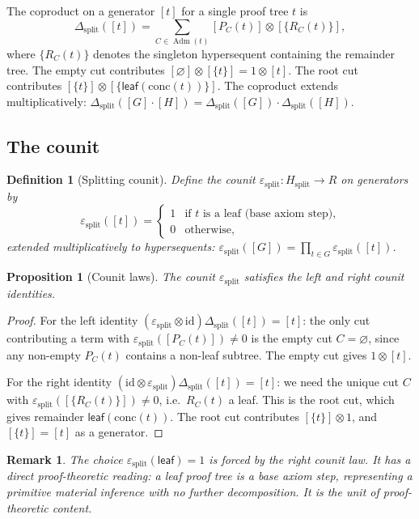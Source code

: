 \documentclass[11pt]{article}
\newtheorem{proposition}[theorem]{Proposition}
\newtheorem{definition}[theorem]{Definition}
\newtheorem{remark}[theorem]{Remark}
\begin{document}
The coproduct on a generator $[t]$ for a single proof tree $t$ is
\[
\Delta_{\mathrm{split}}([t])
=
\sum_{C\in\operatorname{Adm}(t)}
[P_C(t)]\otimes [\{R_C(t)\}],
\]
where $\{R_C(t)\}$ denotes the singleton hypersequent containing the remainder tree.  The empty cut contributes $[\varnothing]\otimes[\{t\}]=1\otimes[t]$.  The root cut contributes $[\{t\}]\otimes[\{\mathsf{leaf}(\mathrm{conc}(t))\}]$.  The coproduct extends multiplicatively: $\Delta_{\mathrm{split}}([G]\cdot[H])=\Delta_{\mathrm{split}}([G])\cdot\Delta_{\mathrm{split}}([H])$.

\subsection{The counit}

\begin{definition}[Splitting counit]
Define the counit $\varepsilon_{\mathrm{split}}:H_{\mathrm{split}}\to R$ on generators by
\[
\varepsilon_{\mathrm{split}}([t])
=
\begin{cases}
1 & \text{if }t\text{ is a leaf (base axiom step),}\\
0 & \text{otherwise,}
\end{cases}
\]
extended multiplicatively to hypersequents: $\varepsilon_{\mathrm{split}}([G])=\prod_{t\in G}\varepsilon_{\mathrm{split}}([t])$.
\end{definition}

\begin{proposition}[Counit laws]
The counit $\varepsilon_{\mathrm{split}}$ satisfies the left and right counit identities.
\end{proposition}
\begin{proof}
For the left identity $(\varepsilon_{\mathrm{split}}\otimes\mathrm{id})\Delta_{\mathrm{split}}([t])=[t]$: the only cut contributing a term with $\varepsilon_{\mathrm{split}}([P_C(t)])\neq 0$ is the empty cut $C=\varnothing$, since any non-empty $P_C(t)$ contains a non-leaf subtree.  The empty cut gives $1\otimes[t]$.

For the right identity $(\mathrm{id}\otimes\varepsilon_{\mathrm{split}})\Delta_{\mathrm{split}}([t])=[t]$: we need the unique cut $C$ with $\varepsilon_{\mathrm{split}}([\{R_C(t)\}])\neq 0$, i.e.\ $R_C(t)$ a leaf.  This is the root cut, which gives remainder $\mathsf{leaf}(\mathrm{conc}(t))$.  The root cut contributes $[\{t\}]\otimes 1$, and $[\{t\}]=[t]$ as a generator.
\end{proof}

\begin{remark}
The choice $\varepsilon_{\mathrm{split}}(\mathsf{leaf})=1$ is forced by the right counit law.  It has a direct proof-theoretic reading: a leaf proof tree is a base axiom step, representing a primitive material inference with no further decomposition.  It is the unit of proof-theoretic content.
\end{remark}
\end{document}
